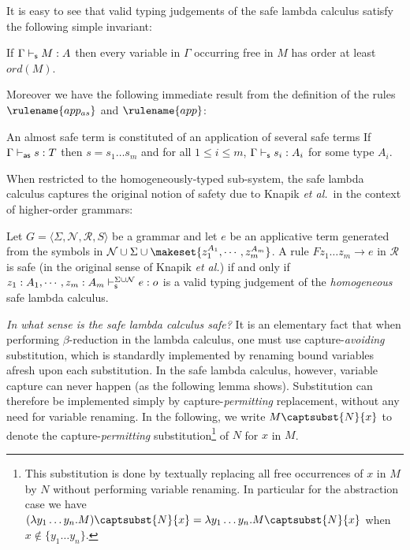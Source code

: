 It is easy to see that valid typing judgements of the safe lambda
calculus satisfy the following simple invariant:
\begin{lemma}
\label{lem:ordfreevar}
If $\Gamma \vdash_{\sf s} M : A$ then every variable in $\Gamma$ occurring
free in $M$ has order at least $ord(M)$.
\end{lemma}

Moreover we have the following immediate result from the definition of the rules $\rulename{app_{as}}$
and $\rulename{app}$:
\begin{lemma}
\label{lem:almostsafe_is_appplicative_safe} An almost safe term is
constituted of an application of several safe terms \ie If $\Gamma
\vdash_{\sf as} s : T$ then $s = s_1 \ldots s_m$ and for all $1 \leq i\leq
m$, $\Gamma \vdash_{\sf s} s_i : A_i$ for some type $A_i$.
\end{lemma}


When restricted to the homogeneously-typed sub-system, the safe
lambda calculus captures the original notion of safety due to Knapik
\emph{et al.}~in the context of higher-order grammars:

\begin{proposition} Let $G = \langle \Sigma, \mathcal{N}, \mathcal{R},
  S \rangle$ be a grammar and let $e$ be an applicative term generated
  from the symbols in $\mathcal{N} \cup \Sigma \cup \makeset{z_1^{A_1},
    \cdots, z_m^{A_m}}$.  A rule $F z_1 \ldots z_m \rightarrow e$ in
  $\mathcal{R}$ is safe (in the original sense of Knapik \emph{et al.}) if and only if $ z_1 : A_1, \cdots, z_m : A_m
  \vdash_{\sf s}^{\Sigma \cup \mathcal{N}} e : o$ is a valid typing judgement
  of the \emph{homogeneous} safe lambda calculus.
\end{proposition}


\emph{In what sense is the safe lambda calculus safe?} It is an
elementary fact that when performing $\beta$-reduction in the lambda
calculus, one must use capture-\emph{avoiding} substitution, which
is standardly implemented by renaming bound variables afresh upon
each substitution. In the safe lambda calculus, however, variable
capture can never happen (as the following lemma shows).
Substitution can therefore be implemented simply by
capture-\emph{permitting} replacement, without any need for variable
renaming. In the following, we write $M\captsubst{N}{x}$ to denote
the capture-\emph{permitting} substitution\footnote{This
substitution is done by textually replacing all free occurrences of
$x$ in $M$ by $N$ without performing variable renaming.  In
particular for the abstraction
  case we have
$(\lambda y_1\ldots y_n . M)\captsubst{N}{x} = \lambda y_1\ldots y_n . M\captsubst{N}{x}$ when $x\not\in
  \{ y_1\ldots y_n \}$.}
of $N$ for $x$ in $M$.

